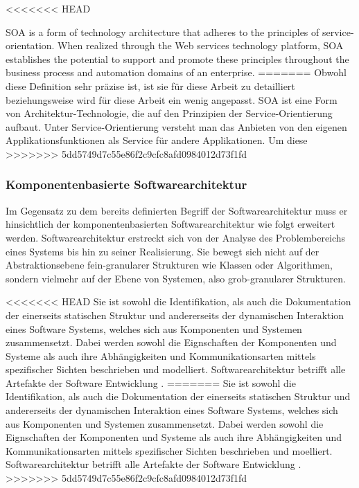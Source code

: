<<<<<<< HEAD



SOA is a form of technology architecture that adheres to the principles of service-orientation. When realized through the Web services technology platform, SOA establishes the potential to support and promote these principles throughout the business process and automation domains of an enterprise.
=======
Obwohl diese Definition sehr präzise ist, ist sie für diese Arbeit zu detailliert beziehungsweise wird für diese Arbeit ein wenig angepasst. SOA ist eine Form von Architektur-Technologie, die auf den Prinzipien der Service-Orientierung aufbaut. Unter Service-Orientierung versteht man das Anbieten von den eigenen Applikationsfunktionen als Service für andere Applikationen.
Um diese
>>>>>>> 5dd5749d7c55e86f2c9cfc8afd0984012d73f1fd




\subsubsection{Komponentenbasierte Softwarearchitektur}
\label{sec:2_Komponentenbasierte_Softwarearchitektur}
Im Gegensatz zu dem bereits definierten Begriff der Softwarearchitektur muss er hinsichtlich der komponentenbasierten Softwarearchitektur wie folgt erweitert werden. Softwarearchitektur erstreckt sich von der Analyse des Problembereichs eines Systems bis hin zu seiner Realisierung. Sie bewegt sich nicht auf der Abstraktionsebene fein-granularer Strukturen wie Klassen oder Algorithmen, sondern vielmehr auf der Ebene von Systemen, also grob-granularer Strukturen.

<<<<<<< HEAD
Sie ist sowohl die Identifikation, als auch die Dokumentation der einerseits statischen Struktur und andererseits der dynamischen Interaktion eines Software Systems, welches sich aus Komponenten und Systemen zusammensetzt. Dabei werden sowohl die Eignschaften der Komponenten und Systeme als auch ihre Abhängigkeiten und Kommunikationsarten mittels spezifischer Sichten beschrieben und modelliert. Softwarearchitektur betrifft alle Artefakte der Software Entwicklung \citereset \autocite{Andresen.2003}.
=======
Sie ist sowohl die Identifikation, als auch die Dokumentation der einerseits statischen Struktur und andererseits der dynamischen Interaktion eines Software Systems, welches sich aus Komponenten und Systemen zusammensetzt. Dabei werden sowohl die Eignschaften der Komponenten und Systeme als auch ihre Abhängigkeiten und Kommunikationsarten mittels spezifischer Sichten beschrieben und moelliert. Softwarearchitektur betrifft alle Artefakte der Software Entwicklung \citereset \autocite{Andresen.2003}.
>>>>>>> 5dd5749d7c55e86f2c9cfc8afd0984012d73f1fd




